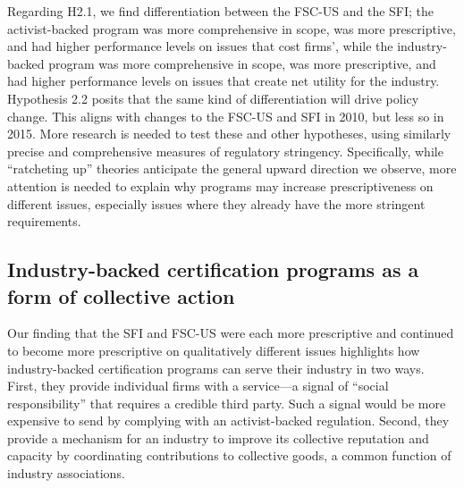 \documentclass[
      12pt,
            Review ]{article}
\begin{document}
Regarding H2.1, we find differentiation between the FSC-US and the SFI;
the activist-backed program was more comprehensive in scope, was more
prescriptive, and had higher performance levels on issues that cost
firms', while the industry-backed program was more comprehensive in
scope, was more prescriptive, and had higher performance levels on
issues that create net utility for the industry. Hypothesis 2.2 posits
that the same kind of differentiation will drive policy change. This
aligns with changes to the FSC-US and SFI in 2010, but less so in 2015.
More research is needed to test these and other hypotheses, using
similarly precise and comprehensive measures of regulatory stringency.
Specifically, while ``ratcheting up'' theories anticipate the general
upward direction we observe, more attention is needed to explain why
programs may increase prescriptiveness on different issues, especially
issues where they already have the more stringent requirements.

\subsection{Industry-backed certification programs as a form of
collective
action}\label{industry-backed-certification-programs-as-a-form-of-collective-action}

Our finding that the SFI and FSC-US were each more prescriptive and
continued to become more prescriptive on qualitatively different issues
highlights how industry-backed certification programs can serve their
industry in two ways. First, they provide individual firms with a
service---a signal of ``social responsibility'' that requires a credible
third party. Such a signal would be more expensive to send by complying
with an activist-backed regulation. Second, they provide a mechanism for
an industry to improve its collective reputation and capacity by
coordinating contributions to collective goods, a common function of
industry associations.
\end{document}
